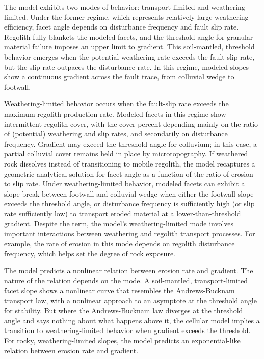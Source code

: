 The model exhibits two modes of behavior: transport-limited and weathering-limited. Under the former regime, which represents relatively large weathering efficiency, facet angle depends on disturbance frequency and fault slip rate. Regolith fully blankets the modeled facets, and the threshold angle for granular-material failure imposes an upper limit to gradient. This soil-mantled, threshold behavior emerges when the potential weathering rate exceeds the fault slip rate, but the slip rate outpaces the disturbance rate. In this regime, modeled slopes show a continuous gradient across the fault trace, from colluvial wedge to footwall.

Weathering-limited behavior occurs when the fault-slip rate exceeds the maximum regolith production rate. Modeled facets in this regime show intermittent regolith cover, with the cover percent depending mainly on the ratio of (potential) weathering and slip rates, and secondarily on disturbance frequency. Gradient may exceed the threshold angle for colluvium; in this case, a partial colluvial cover remains held in place by microtopography. If weathered rock dissolves instead of transitioning to mobile regolith, the model recaptures a geometric analytical solution for facet angle as a function of the ratio of erosion to slip rate. Under weathering-limited behavior, modeled facets can exhibit a slope break between footwall and colluvial wedge when either the footwall slope exceeds the threshold angle, or disturbance frequency is sufficiently high (or slip rate sufficiently low) to transport eroded material at a lower-than-threshold gradient. Despite the term, the model's weathering-limited mode involves important interactions between weathering and regolith transport processes. For example, the rate of erosion in this mode depends on regolith disturbance frequency, which helps set the degree of rock exposure.

The model predicts a nonlinear relation between erosion rate and gradient. The nature of the relation depends on the mode. A soil-mantled, transport-limited facet slope shows a nonlinear curve that resembles the Andrews-Bucknam transport law, with a nonlinear approach to an asymptote at the threshold angle for stability. But where the Andrews-Bucknam law diverges at the threshold angle and says nothing about what happens above it, the cellular model implies a transition to weathering-limited behavior when gradient exceeds the threshold. For rocky, weathering-limited slopes, the model predicts an exponential-like relation between erosion rate and gradient.

